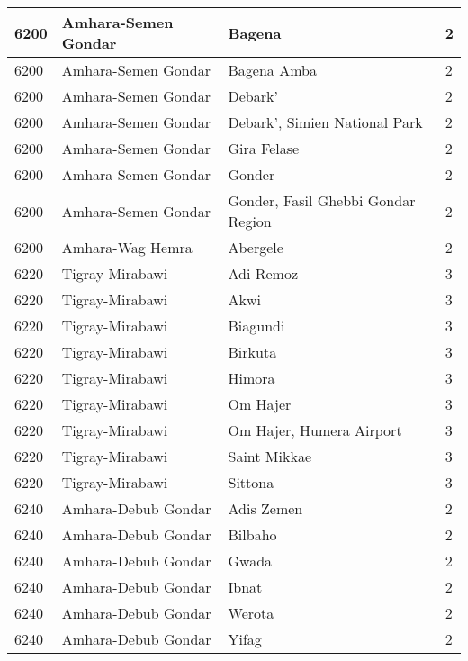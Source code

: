 \documentclass[12pt,a4paper,openbib,titlepage]{report}
\begin{document}
\begin{longtable}{|p{2cm}|p{6.5cm}|p{8cm}|p{1.5cm}|}
\hline 
\rule[-1ex]{0pt}{2.5ex} 6200 & Amhara-Semen Gondar & Bagena & 2 \\
\hline 
\rule[-1ex]{0pt}{2.5ex} 6200 & Amhara-Semen Gondar & Bagena Amba & 2 \\
\hline 
\rule[-1ex]{0pt}{2.5ex} 6200 & Amhara-Semen Gondar & Debark' & 2 \\
\hline 
\rule[-1ex]{0pt}{2.5ex} 6200 & Amhara-Semen Gondar & Debark', Simien National Park & 2 \\
\hline 
\rule[-1ex]{0pt}{2.5ex} 6200 & Amhara-Semen Gondar & Gira Felase & 2 \\
\hline 
\rule[-1ex]{0pt}{2.5ex} 6200 & Amhara-Semen Gondar & Gonder & 2 \\
\hline 
\rule[-1ex]{0pt}{2.5ex} 6200 & Amhara-Semen Gondar & Gonder, Fasil Ghebbi Gondar Region & 2 \\
\hline 
\rule[-1ex]{0pt}{2.5ex} 6200 & Amhara-Wag Hemra & Abergele & 2 \\
\hline 
\rule[-1ex]{0pt}{2.5ex} 6220 & Tigray-Mirabawi & Adi Remoz & 3 \\
\hline 
\rule[-1ex]{0pt}{2.5ex} 6220 & Tigray-Mirabawi & Akwi & 3 \\
\hline 
\rule[-1ex]{0pt}{2.5ex} 6220 & Tigray-Mirabawi & Biagundi & 3 \\
\hline 
\rule[-1ex]{0pt}{2.5ex} 6220 & Tigray-Mirabawi & Birkuta & 3 \\
\hline 
\rule[-1ex]{0pt}{2.5ex} 6220 & Tigray-Mirabawi & Himora & 3 \\
\hline 
\rule[-1ex]{0pt}{2.5ex} 6220 & Tigray-Mirabawi & Om Hajer & 3 \\
\hline 
\rule[-1ex]{0pt}{2.5ex} 6220 & Tigray-Mirabawi & Om Hajer, Humera Airport & 3 \\
\hline 
\rule[-1ex]{0pt}{2.5ex} 6220 & Tigray-Mirabawi & Saint Mikkae & 3 \\
\hline 
\rule[-1ex]{0pt}{2.5ex} 6220 & Tigray-Mirabawi & Sittona & 3 \\
\hline 
\rule[-1ex]{0pt}{2.5ex} 6240 & Amhara-Debub Gondar & Adis Zemen & 2 \\
\hline 
\rule[-1ex]{0pt}{2.5ex} 6240 & Amhara-Debub Gondar & Bilbaho & 2 \\
\hline 
\rule[-1ex]{0pt}{2.5ex} 6240 & Amhara-Debub Gondar & Gwada & 2 \\
\hline 
\rule[-1ex]{0pt}{2.5ex} 6240 & Amhara-Debub Gondar & Ibnat & 2 \\
\hline 
\rule[-1ex]{0pt}{2.5ex} 6240 & Amhara-Debub Gondar & Werota & 2 \\
\hline 
\rule[-1ex]{0pt}{2.5ex} 6240 & Amhara-Debub Gondar & Yifag & 2 \\

\end{longtable}
\end{document}
